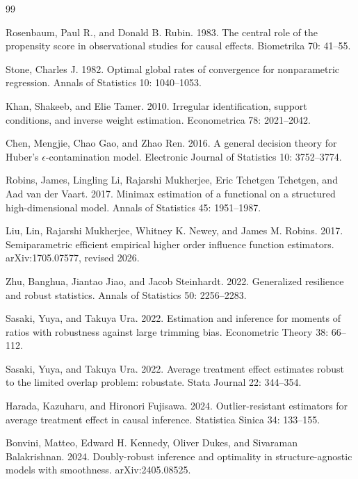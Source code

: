 \documentclass{article}
\begin{document}
\begin{thebibliography}{99}

   Rosenbaum, Paul R., and Donald B. Rubin. 1983. The central role of the propensity score in observational studies for causal effects. Biometrika 70: 41--55.

   Stone, Charles J. 1982. Optimal global rates of convergence for nonparametric regression. Annals of Statistics 10: 1040--1053.

   Khan, Shakeeb, and Elie Tamer. 2010. Irregular identification, support conditions, and inverse weight estimation. Econometrica 78: 2021--2042.

   Chen, Mengjie, Chao Gao, and Zhao Ren. 2016. A general decision theory for Huber's \(\epsilon\)-contamination model. Electronic Journal of Statistics 10: 3752--3774.

   Robins, James, Lingling Li, Rajarshi Mukherjee, Eric Tchetgen Tchetgen, and Aad van der Vaart. 2017. Minimax estimation of a functional on a structured high-dimensional model. Annals of Statistics 45: 1951--1987.

   Liu, Lin, Rajarshi Mukherjee, Whitney K. Newey, and James M. Robins. 2017. Semiparametric efficient empirical higher order influence function estimators. arXiv:1705.07577, revised 2026.

   Zhu, Banghua, Jiantao Jiao, and Jacob Steinhardt. 2022. Generalized resilience and robust statistics. Annals of Statistics 50: 2256--2283.

   Sasaki, Yuya, and Takuya Ura. 2022. Estimation and inference for moments of ratios with robustness against large trimming bias. Econometric Theory 38: 66--112.

   Sasaki, Yuya, and Takuya Ura. 2022. Average treatment effect estimates robust to the limited overlap problem: robustate. Stata Journal 22: 344--354.

   Harada, Kazuharu, and Hironori Fujisawa. 2024. Outlier-resistant estimators for average treatment effect in causal inference. Statistica Sinica 34: 133--155.

   Bonvini, Matteo, Edward H. Kennedy, Oliver Dukes, and Sivaraman Balakrishnan. 2024. Doubly-robust inference and optimality in structure-agnostic models with smoothness. arXiv:2405.08525.


\end{thebibliography}
\end{document}
